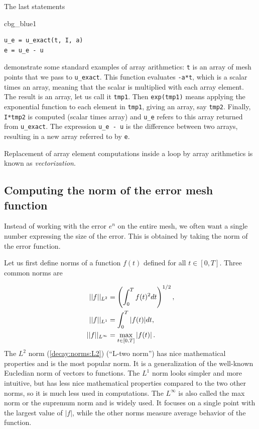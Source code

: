 \documentclass[%
oneside,                 %
final,                   %
10pt]{article}
\newenvironment{_cod_tight}[1]{
   \def\FrameCommand{\colorbox{#1}}
   \FrameRule0.6pt\MakeFramed {\FrameRestore}\vskip3mm}
   {\vskip0mm\endMakeFramed}
\newenvironment{cod}[1]{
\bgroup\rmfamily
\fboxsep=0mm\relax
\begin{_cod_tight}{#1}
\list{}{\parsep=-2mm\parskip=0mm\topsep=0pt\leftmargin=2mm
\rightmargin=2\leftmargin\leftmargin=4pt\relax}
\item\relax}
{\endlist\end{_cod_tight}\egroup}
\newenvironment{notice_mdfboxadmon}[1][]{
\begin{notice_mdfboxmdframed}[frametitle=#1]
}
{
\end{notice_mdfboxmdframed}
}
\begin{document}
  


\begin{notice_mdfboxadmon}
The last statements

\begin{cod}{cbg_blue1}\begin{Verbatim}[numbers=none,fontsize=\fontsize{9pt}{9pt},baselinestretch=0.95,xleftmargin=2mm]
u_e = u_exact(t, I, a)
e = u_e - u
\end{Verbatim}
\end{cod}
\noindent
demonstrate some standard examples of array arithmetics: \texttt{t} is an
array of mesh points that we pass to \Verb!u_exact!. This function
evaluates \texttt{-a*t}, which is a scalar times an array, meaning that
the scalar is multiplied with each array element.
The result is an array, let us call it \texttt{tmp1}. Then
\texttt{exp(tmp1)} means applying the exponential function to each element in
\texttt{tmp1}, giving an array, say \texttt{tmp2}. Finally, \texttt{I*tmp2} is computed
(scalar times array) and \Verb!u_e! refers to this array returned from
\Verb!u_exact!. The expression \Verb!u_e - u! is the difference between
two arrays, resulting in a new array referred to by \texttt{e}.

Replacement of array element computations inside a loop by array
arithmetics is known as \emph{vectorization}.
\end{notice_mdfboxadmon}



\subsection{Computing the norm of the error mesh function}
\label{decay:computing:error:norm}


Instead of working with the error $e^n$ on the entire mesh, we
often want a single number expressing the size of the error.
This is obtained by taking the norm of the error function.

Let us first define norms of a function $f(t)$
defined for all $t\in [0,T]$.
Three common norms are

\begin{align}
||f||_{L^2} &= \left( \int_0^T f(t)^2 dt\right)^{1/2},
\label{decay:norms:L2}\\ 
||f||_{L^1} &= \int_0^T |f(t)| dt,
\label{decay:norms:L1}\\ 
||f||_{L^\infty} &= \max_{t\in [0,T]}|f(t)|\thinspace .
\label{decay:norms:Linf}
\end{align}
The $L^2$ norm (\ref{decay:norms:L2}) (``L-two norm'')
has nice mathematical properties and
is the most popular norm. It is a generalization
of the well-known Eucledian norm of vectors to functions.
The $L^1$ norm looks simpler and more intuitive, but has less
nice mathematical properties compared to the two other norms, so
it is much less used in computations.
The $L^\infty$ is also called the max norm or the supremum norm
and is widely used. It focuses on a single point with the largest
value of $|f|$, while the other norms measure average behavior of
the function.
\end{document}
